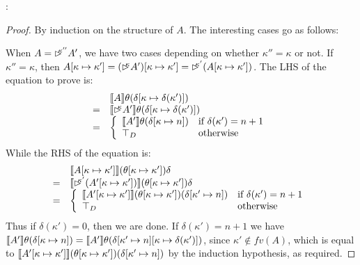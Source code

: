 :

\begin{proof}
  By induction on the structure of $A$. The interesting cases go as
  follows:

  When $A = \mathord{\rhd\kern-0.4em^{\kappa''}}A'$, we have two cases depending on
  whether $\kappa'' = \kappa$ or not. If $\kappa'' = \kappa$, then
  $A[\kappa \mapsto \kappa'] = (\mathord{\rhd\kern-0.4em^{\kappa}} A')[\kappa \mapsto
  \kappa'] = \mathord{\rhd\kern-0.4em^{\kappa'}} (A[\kappa \mapsto \kappa'])$. The LHS of
  the equation to prove is:
  \begin{displaymath}
    \begin{array}{cl}
      & \llbracket A \rrbracket\theta (\delta[\kappa \mapsto \delta(\kappa')]) \\
      =& \llbracket \mathord{\rhd\kern-0.4em^{\kappa}}A' \rrbracket \theta (\delta[\kappa \mapsto \delta(\kappa')]) \\
      =& \left\{
        \begin{array}{ll}
          \llbracket A' \rrbracket\theta(\delta[\kappa \mapsto n]) & \textrm{if }\delta(\kappa') = n + 1 \\
          \top_D & \textrm{otherwise}
        \end{array}
      \right.
    \end{array}
  \end{displaymath}
  While the RHS of the equation is:
  \begin{displaymath}
    \begin{array}{cl}
      & \llbracket A[\kappa \mapsto \kappa'] \rrbracket(\theta[\kappa\mapsto\kappa'])\delta \\
      =&\llbracket \mathord{\rhd\kern-0.4em^{\kappa'}}(A'[\kappa\mapsto\kappa']) \rrbracket(\theta[\kappa\mapsto\kappa'])\delta \\
      =&\left\{
        \begin{array}{ll}
          \llbracket A'[\kappa\mapsto\kappa'] \rrbracket(\theta[\kappa\mapsto\kappa'])(\delta[\kappa' \mapsto n]) & \textrm{if }\delta(\kappa') = n + 1 \\
          \top_D & \textrm{otherwise}
        \end{array}
      \right.
    \end{array}
  \end{displaymath}
  Thus if $\delta(\kappa') = 0$, then we are done. If $\delta(\kappa')
  = n + 1$ we have $\llbracket A' \rrbracket\theta(\delta[\kappa\mapsto n]) =
  \llbracket A' \rrbracket\theta(\delta[\kappa'\mapsto n][\kappa \mapsto
  \delta(\kappa')])$, since $\kappa' \not\in \mathit{fv}(A)$, which is
  equal to
  $\llbracket A'[\kappa\mapsto\kappa'] \rrbracket(\theta[\kappa\mapsto\kappa'])(\delta[\kappa'\mapsto
  n])$ by the induction hypothesis, as required.


\end{proof}
